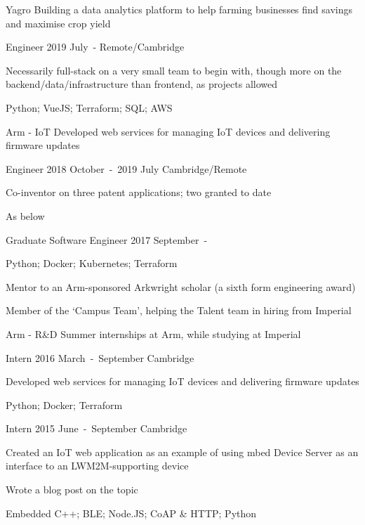 \begin{cventries}

\cventryjob
  {Yagro}
  {Building a data analytics platform to help farming businesses find savings and maximise crop yield}

\cventryrole
  {Engineer}
  {2019 July~-}
  {Remote/Cambridge}
  {\begin{cvitems}
    \item {Necessarily full-stack on a very small team to begin with, though more on the backend/data/infrastructure than frontend, as projects allowed}
    \item {Python; VueJS; Terraform; SQL; AWS}
  \end{cvitems}}

\cventryjob
  {Arm - IoT}
  {Developed web services for managing IoT devices and delivering firmware updates}

\cventryrole
  {Engineer}
  {2018 October~-~2019 July}
  {Cambridge/Remote}
  {\begin{cvitems}
    \item {Co-inventor on three patent applications; two granted to date}
    \item {As below}
  \end{cvitems}}

\cventryrole
  {Graduate Software Engineer}
  {2017 September~-}
  {}
  {\begin{cvitems}
    \item {Python; Docker; Kubernetes; Terraform}
    \item {Mentor to an Arm-sponsored Arkwright scholar (a sixth form engineering award)}
    \item {Member of the `Campus Team', helping the Talent team in hiring from Imperial}
  \end{cvitems}}

\cventryjob
  {Arm - R\&D}
  {Summer internships at Arm, while studying at Imperial}

\cventryrole
  {Intern}
  {2016 March~-~September}
  {Cambridge}
  {\begin{cvitems}
    \item {Developed web services for managing IoT devices and delivering firmware updates}
    \item {Python; Docker; Terraform}
  \end{cvitems}}

\cventryrole
  {Intern}
  {2015 June~-~September}
  {Cambridge}
  {\begin{cvitems}
    \item {Created an IoT web application as an example of using mbed Device Server as an interface to an LWM2M-supporting device}
    \item {Wrote a blog post on the topic}
    \item {Embedded C++; BLE; Node.JS; CoAP \& HTTP; Python}
  \end{cvitems}}


\end{cventries}

